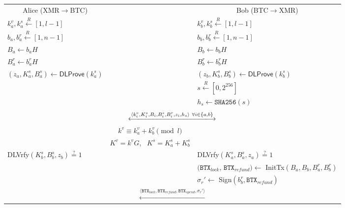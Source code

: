 \documentclass{llncs}
\renewcommand{\arraystretch}{1.5}
\newcommand{\BTX}{\texttt{BTX}}
\newcommand{\Sign}{\textsf{Sign}}
\newcommand{\DLProve}{\textsf{DLProve}}
\newcommand{\DLVrfy}{\textsf{DLVrfy}}
\newcommand{\InitTx}{\textsf{InitTx}}
\begin{document}
\begin{figure}[H]
    \begin{table}[H]
        \centering
      {\renewcommand{\arraystretch}{1.1}%
      \begin{tabular}{ | l c l | }
        \hline
          \multicolumn{1}{|c}{Alice (XMR$\rightarrow$BTC)} &  & \multicolumn{1}{c|}{Bob (BTC$\rightarrow$XMR)} \\
          $k^v_a, k^s_a \xleftarrow{R} [1, l-1]$ & & $k^v_b, k^s_b \xleftarrow{R} [1, l-1]$ \\
          $b_a,b^r_a \xleftarrow{R} [1, n-1]$ & & $b_b,b^r_b \xleftarrow{R} [1, n-1]$ \\
          $B_a \leftarrow b_aH$ & & $B_b \leftarrow b_bH$ \\
          $B^r_a \leftarrow b^r_aH$ & & $B^r_b \leftarrow b^r_bH$ \\
          $(z_a, K^s_a, B^s_a) \leftarrow \DLProve(k^s_a)$ & & $(z_b, K^s_b, B^s_b) \leftarrow \DLProve(k^s_b)$ \\
          & & $s \xleftarrow{R} [0, 2^{256}]$ \\
          & & $h_s \gets \texttt{SHA256}(s)$ \\
           & & \\

          \multicolumn{3}{|c|}{$\xlongleftrightarrow{\langle k^v_i, K^s_i, B_i, B^s_i, B^r_i, z_i, h_s \rangle \  \forall i \in \{a, b\}}$} \\

          & $k^v \equiv k^v_a + k^v_b \pmod l$ & \\
          & $K^v = k^vG$, \ $K^s = K^s_a + K^s_b$ & \\

          \DLVrfy$(K^s_b, B^s_b, z_b) \stackrel{?}{=} 1$ & & \DLVrfy$(K^s_a, B^s_a, z_a) \stackrel{?}{=} 1$ \\
          & & $(\BTX_\textit{lock}$, $\BTX_\textit{refund}) \gets$ \InitTx$(B_a, B_b, B^r_a, B^r_b)$ \\
          & & $\sigma_r' \gets$ \Sign$(b^r_b, \BTX_\textit{refund})$ \\

          \multicolumn{3}{|c|}{$\xleftarrow{\langle \BTX_\textit{lock}, \BTX_\textit{refund}, \BTX_\textit{spend}, \sigma_r' \rangle}$} \\


\end{tabular}}
\end{table}
\end{figure}
\end{document}
